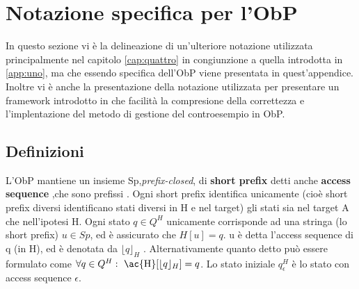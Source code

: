 \section{Notazione specifica per l'ObP}
In questo sezione vi è la delineazione di un'ulteriore notazione utilizzata principalmente nel capitolo \ref{cap:quattro} in congiunzione a quella introdotta in \ref{app:uno}, ma che essendo specifica dell'\ac{ObP} viene presentata in quest'appendice. Inoltre vi è anche la presentazione della notazione utilizzata per presentare un framework introdotto in \cite{StefCounterexample14} che facilità la compresione della correttezza e l'implentazione del metodo di gestione del controesempio in \ac{ObP}.
\subsection{Definizioni}
L'\ac{ObP} mantiene un insieme Sp,\textit{prefix-closed}, di \textbf{short prefix} detti anche \textbf{access sequence} ,che sono prefissi . Ogni short prefix identifica unicamente (cioè short prefix diversi identificano stati diversi in \ac{H} e nel target)  gli stati sia nel target A che nell'ipotesi \ac{H}. Ogni stato $q \in Q^{H}$ unicamente corrisponde ad una stringa (lo short prefix) $u \in Sp$, ed è assicurato che $H[u] = q$.  u è detta l'access sequence di q (in \ac{H}), ed è denotata da $\lfloor q \rfloor_{H}$ . Alternativamente quanto detto può essere formulato come $\forall q \in Q^{H} : \text{ \ac{H}}[\lfloor q \rfloor_{H}]=q$. Lo stato iniziale $q_{\epsilon}^{H}$ è lo stato con access sequence $\epsilon$.

